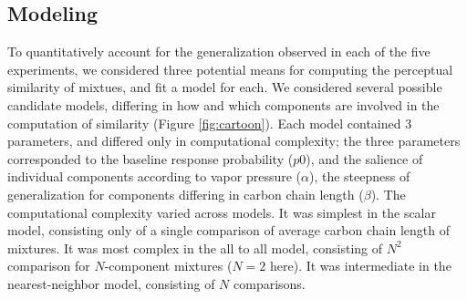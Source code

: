\subsection*{Modeling}
\label{sec:results_modeling}
To quantitatively account for the generalization observed in each of the five experiments, we considered three potential means for computing the perceptual similarity of mixtues, and fit a model for each.  
We considered several possible candidate models, differing in how and which components are involved in the computation of similarity (Figure \ref{fig:cartoon}).  
Each model contained 3 parameters, and differed only in computational complexity; the three parameters corresponded to the baseline response probability ($p0$), and the salience of individual components according to vapor pressure ($\alpha$), the steepness of generalization for components differing in carbon chain length ($\beta$).  
The computational complexity varied across models.  It was simplest in the scalar model, consisting only of a single comparison of average carbon chain length of mixtures.  It was most complex in the all to all model, consisting of $N^2$ comparison for $N$-component mixtures ($N=2$ here).  It was intermediate in the nearest-neighbor model, consisting of $N$ comparisons.  